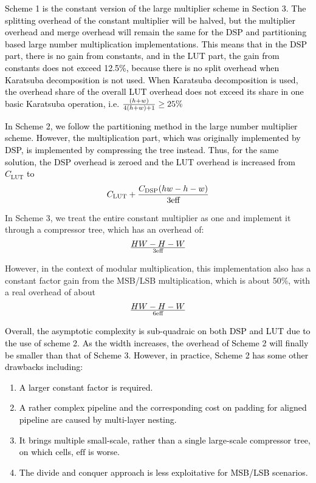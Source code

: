 \documentclass[conference]{IEEEtran}
\begin{document}
\textcolor{black}{
Scheme 1 is the constant version of the large multiplier scheme in Section 3.  The splitting overhead of the constant multiplier will be halved,  but the multiplier overhead and merge overhead will remain the same for the DSP and partitioning based large number multiplication implementations.  This means that in the DSP part, there is no gain from constants, and in the LUT part, the gain from constants does not exceed 12.5\%,  because there is no split overhead when Karatsuba decomposition is not used. When Karatsuba decomposition is used, the overhead share of the overall LUT overhead does not exceed its share in one basic Karatsuba operation,  i.e. ${(h+w)\over {4(h+w)+1}} \ge 25\%$
}

\textcolor{black}{
In Scheme 2, we follow the partitioning method in the large number multiplier scheme. However, the multiplication part, which was originally implemented by DSP, is implemented by compressing the tree instead. Thus, for the same solution, the DSP overhead is zeroed and the LUT overhead is increased from $C_{\text{LUT}}$ to
\begin{equation}
    C_{\text{LUT}} + {C_{\text{DSP}}(hw-h-w)\over 3\text{eff}}
\end{equation}
}

In Scheme 3, we treat the entire constant multiplier as one and implement it through a compressor tree, which has an overhead of:
\begin{equation}
    HW - H - W \over {3\text{eff}}
\end{equation}

However, in the context of modular multiplication,  this implementation also has a constant factor gain from the MSB/LSB multiplication, which is about 50\%, with a real overhead of about
\begin{equation}
    HW - H - W \over {6\text{eff}}
\end{equation}

\textcolor{black}{
Overall, the asymptotic complexity is sub-quadraic on both DSP and LUT due to the use of scheme 2.  As the width increases, the overhead of Scheme 2 will finally be smaller than that of Scheme 3. However, in practice, Scheme 2 has some other drawbacks including:
\begin{enumerate}[(1)]
    \item A larger constant factor is required.
    \item A rather complex pipeline and the corresponding cost on padding for aligned pipeline are caused by multi-layer nesting.
    \item It brings multiple small-scale, rather than a single large-scale compressor tree, on which cells, $\text{eff}$ is worse.
    \item The divide and conquer approach is less exploitative for MSB/LSB scenarios.
\end{enumerate}
}
\end{document}

